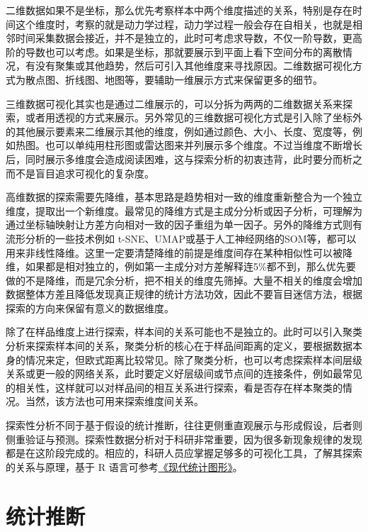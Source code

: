 \documentclass[]{tufte-book}
\begin{document}
二维数据如果不是坐标，那么优先考察样本中两个维度描述的关系，特别是存在时间这个维度时，考察的就是动力学过程，动力学过程一般会存在自相关，也就是相邻时间采集数据会接近，并不是独立的，此时可考虑求导数，不仅一阶导数，更高阶的导数也可以考虑。如果是坐标，那就要展示到平面上看下空间分布的离散情况，有没有聚集或其他趋势，然后可引入其他维度来寻找原因。二维数据可视化方式为散点图、折线图、地图等，要辅助一维展示方式来保留更多的细节。

三维数据可视化其实也是通过二维展示的，可以分拆为两两的二维数据关系来探索，或者用透视的方式来展示。另外常见的三维数据可视化方式是引入除了坐标外的其他展示要素来二维展示其他的维度，例如通过颜色、大小、长度、宽度等，例如热图。也可以单纯用柱形图或雷达图来并列展示多个维度。不过当维度不断增长后，同时展示多维度会造成阅读困难，这与探索分析的初衷违背，此时要分而析之而不是盲目追求可视化的复杂度。

高维数据的探索需要先降维，基本思路是趋势相对一致的维度重新整合为一个独立维度，提取出一个新维度。最常见的降维方式是主成分分析或因子分析，可理解为通过坐标轴映射让方差方向相对一致的因子重组为单一因子。另外的降维方式则有流形分析的一些技术例如 t-SNE、UMAP或基于人工神经网络的SOM等，都可以用来非线性降维。这里一定要清楚降维的前提是维度间存在某种相似性可以被降维，如果都是相对独立的，例如第一主成分对方差解释连5\%都不到，那么优先要做的不是降维，而是冗余分析，把不相关的维度先筛掉。大量不相关的维度会增加数据整体方差且降低发现真正规律的统计方法功效，因此不要盲目迷信方法，根据探索的方向来保留有意义的数据维度。

除了在样品维度上进行探索，样本间的关系可能也不是独立的。此时可以引入聚类分析来探索样本间的关系，聚类分析的核心在于样品间距离的定义，要根据数据本身的情况来定，但欧式距离比较常见。除了聚类分析，也可以考虑探索样本间层级关系或更一般的网络关系，此时要定义好层级间或节点间的连接条件，例如最常见的相关性，这样就可以对样品间的相互关系进行探索，看是否存在样本聚类的情况。当然，该方法也可用来探索维度间关系。

探索性分析不同于基于假设的统计推断，往往更侧重直观展示与形成假设，后者则侧重验证与预测。探索性数据分析对于科研非常重要，因为很多新现象规律的发现都是在这阶段完成的。相应的，科研人员应掌握足够多的可视化工具，了解其探索的关系与原理，基于 R 语言可参考\href{https://bookdown.org/xiangyun/msg/}{《现代统计图形》}。

\hypertarget{ux7edfux8ba1ux63a8ux65ad}{%
\section{统计推断}\label{ux7edfux8ba1ux63a8ux65ad}}
\end{document}
